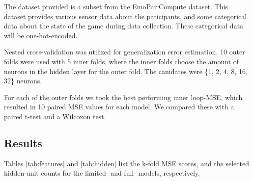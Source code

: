 \documentclass[12pt]{article}
\begin{document}
The dataset provided is a subset from the EmoPairCompute dataset.
This dataset provides various sensor data about the paticipants, and some categorical data about the state of the game during data collection.
These categorical data will be one-hot-encoded.

Nested cross-validation was utilized for generalization error estimation.
10 outer folds were used with 5 inner folds, where the inner folds choose the amount of neurons in the hidden layer for the outer fold.
The canidates were \{1, 2, 4, 8, 16, 32\} neurons.

For each of the outer folds we took the best performing inner loop-MSE, which resulted in 10 paired MSE values for each model.
We compared these with a paired t-test and a Wilcoxon test.

\subsection{Results}
Tables \ref{tab:features} and \ref{tab:hidden} list the k-fold MSE scores, and the selected hidden-unit counts for the limited- and full- models, respectively.
\end{document}
